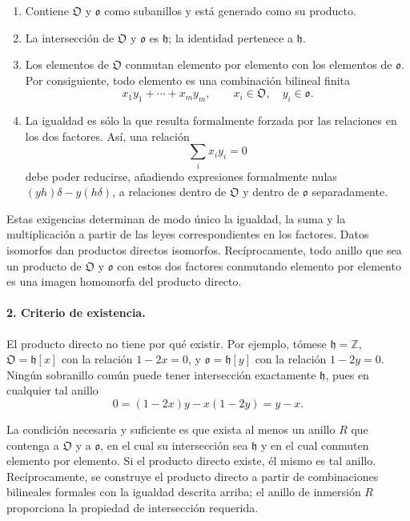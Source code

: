 \begin{enumerate}
\item Contiene $\mathfrak O$ y $\mathfrak o$ como subanillos y está generado como su producto.
\item La intersección de $\mathfrak O$ y $\mathfrak o$ es $\mathfrak h$; la identidad pertenece a $\mathfrak h$.
\item Los elementos de $\mathfrak O$ conmutan elemento por elemento con los elementos de $\mathfrak o$. Por consiguiente, todo elemento es una combinación bilineal finita
\[
        x_1y_1+\cdots+x_my_m,
        \qquad x_i\in\mathfrak O,
        \quad y_i\in\mathfrak o.
\]
\item La igualdad es sólo la que resulta formalmente forzada por las relaciones en los dos factores. Así, una relación
\[
        \sum_i x_i y_i=0
\]
debe poder reducirse, añadiendo expresiones formalmente nulas $(yh)\delta-y(h\delta)$, a relaciones dentro de $\mathfrak O$ y dentro de $\mathfrak o$ separadamente.
\end{enumerate}

Estas exigencias determinan de modo único la igualdad, la suma y la multiplicación a partir de las leyes correspondientes en los factores. Datos isomorfos dan productos directos isomorfos. Recíprocamente, todo anillo que sea un producto de $\mathfrak O$ y $\mathfrak o$ con estos dos factores conmutando elemento por elemento es una imagen homomorfa del producto directo.

\paragraph{2. Criterio de existencia.}
El producto directo no tiene por qué existir. Por ejemplo, tómese $\mathfrak h=\mathbb Z$, $\mathfrak O=\mathfrak h[x]$ con la relación $1-2x=0$, y $\mathfrak o=\mathfrak h[y]$ con la relación $1-2y=0$. Ningún sobranillo común puede tener intersección exactamente $\mathfrak h$, pues en cualquier tal anillo
\[
        0=(1-2x)y-x(1-2y)=y-x.
\]

La condición necesaria y suficiente es que exista al menos un anillo $R$ que contenga a $\mathfrak O$ y a $\mathfrak o$, en el cual su intersección sea $\mathfrak h$ y en el cual conmuten elemento por elemento. Si el producto directo existe, él mismo es tal anillo. Recíprocamente, se construye el producto directo a partir de combinaciones bilineales formales con la igualdad descrita arriba; el anillo de inmersión $R$ proporciona la propiedad de intersección requerida.

